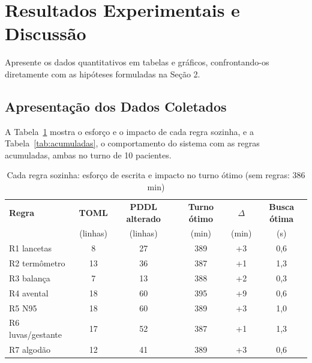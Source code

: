 \documentclass[11pt,a4paper]{article}
\begin{document}
\section{Resultados Experimentais e Discussão}

\begin{instrucao}
Apresente os dados quantitativos em tabelas e gráficos, confrontando-os diretamente com as hipóteses formuladas na Seção 2.
\end{instrucao}

\subsection{Apresentação dos Dados Coletados}
A Tabela~\ref{tab:regras} mostra o esforço e o impacto de cada regra sozinha, e a Tabela~\ref{tab:acumuladas}, o comportamento do sistema com as regras acumuladas, ambas no turno de 10 pacientes.

\begin{table}[ht]
\centering
\caption{Cada regra sozinha: esforço de escrita e impacto no turno ótimo (sem regras: 386 min)}
\label{tab:regras}
\small
\begin{tabular}{@{}lccccc@{}}
\toprule
\textbf{Regra} & \textbf{TOML} & \textbf{PDDL alterado} & \textbf{Turno ótimo} & \textbf{$\Delta$} & \textbf{Busca ótima} \\
 & (linhas) & (linhas) & (min) & (min) & (s) \\ \midrule
R1 lancetas        & 8  & 27 & 389 & +3 & 0,6 \\
R2 termômetro      & 13 & 36 & 387 & +1 & 1,3 \\
R3 balança         & 7  & 13 & 388 & +2 & 0,3 \\
R4 avental         & 18 & 60 & 395 & +9 & 0,6 \\
R5 N95             & 18 & 60 & 389 & +3 & 1,0 \\
R6 luvas/gestante  & 17 & 52 & 387 & +1 & 1,3 \\
R7 algodão         & 12 & 41 & 389 & +3 & 0,6 \\ \bottomrule
\end{tabular}
\end{table}
\end{document}
